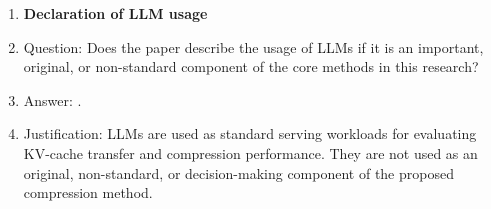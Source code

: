 \begin{enumerate}
\item {\bf Declaration of LLM usage}
    \item[] Question: Does the paper describe the usage of LLMs if it is an important, original, or non-standard component of the core methods in this research?
    \item[] Answer: \answerNA{}.
    \item[] Justification: LLMs are used as standard serving workloads for evaluating KV-cache transfer and compression performance. They are not used as an original, non-standard, or decision-making component of the proposed compression method.

\end{enumerate}
